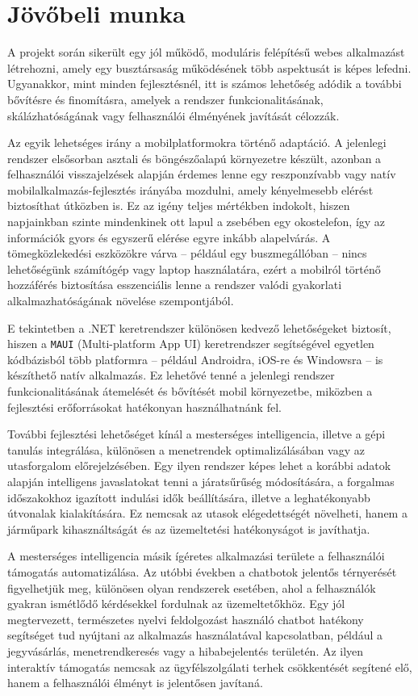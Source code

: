\section{Jövőbeli munka}

A projekt során sikerült egy jól működő, moduláris felépítésű webes alkalmazást létrehozni, amely egy busztársaság működésének több aspektusát is képes lefedni. Ugyanakkor, mint minden fejlesztésnél, itt is számos lehetőség adódik a további bővítésre és finomításra, amelyek a rendszer funkcionalitásának, skálázhatóságának vagy felhasználói élményének javítását célozzák.

Az egyik lehetséges irány a mobilplatformokra történő adaptáció. A jelenlegi rendszer elsősorban asztali és böngészőalapú környezetre készült, azonban a felhasználói visszajelzések alapján érdemes lenne egy reszponzívabb vagy natív mobilalkalmazás-fejlesztés irányába mozdulni, amely kényelmesebb elérést biztosíthat útközben is. Ez az igény teljes mértékben indokolt, hiszen napjainkban szinte mindenkinek ott lapul a zsebében egy okostelefon, így az információk gyors és egyszerű elérése egyre inkább alapelvárás. A tömegközlekedési eszközökre várva – például egy buszmegállóban – nincs lehetőségünk számítógép vagy laptop használatára, ezért a mobilról történő hozzáférés biztosítása esszenciális lenne a rendszer valódi gyakorlati alkalmazhatóságának növelése szempontjából.

E tekintetben a .NET keretrendszer különösen kedvező lehetőségeket biztosít, hiszen a \texttt{MAUI} (Multi-platform App UI) keretrendszer segítségével egyetlen kódbázisból több platformra – például Androidra, iOS-re és Windowsra – is készíthető natív alkalmazás. Ez lehetővé tenné a jelenlegi rendszer funkcionalitásának átemelését és bővítését mobil környezetbe, miközben a fejlesztési erőforrásokat hatékonyan használhatnánk fel.


További fejlesztési lehetőséget kínál a mesterséges intelligencia, illetve a gépi tanulás integrálása, különösen a menetrendek optimalizálásában vagy az utasforgalom előrejelzésében. Egy ilyen rendszer képes lehet a korábbi adatok alapján intelligens javaslatokat tenni a járatsűrűség módosítására, a forgalmas időszakokhoz igazított indulási idők beállítására, illetve a leghatékonyabb útvonalak kialakítására. Ez nemcsak az utasok elégedettségét növelheti, hanem a járműpark kihasználtságát és az üzemeltetési hatékonyságot is javíthatja.

A mesterséges intelligencia másik ígéretes alkalmazási területe a felhasználói támogatás automatizálása. Az utóbbi években a chatbotok jelentős térnyerését figyelhetjük meg, különösen olyan rendszerek esetében, ahol a felhasználók gyakran ismétlődő kérdésekkel fordulnak az üzemeltetőkhöz. Egy jól megtervezett, természetes nyelvi feldolgozást használó chatbot hatékony segítséget tud nyújtani az alkalmazás használatával kapcsolatban, például a jegyvásárlás, menetrendkeresés vagy a hibabejelentés területén. Az ilyen interaktív támogatás nemcsak az ügyfélszolgálati terhek csökkentését segítené elő, hanem a felhasználói élményt is jelentősen javítaná.


